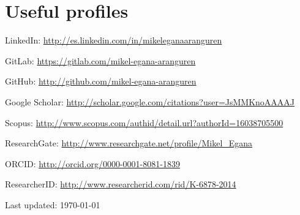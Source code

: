 \documentclass[11pt,fullpage]{article}
\renewenvironment{itemize}{
  \begin{list}{}{
    \setlength{\leftmargin}{1.5em}
  }
}{
  \end{list}
}
\begin{document}
\section*{Useful profiles}
\begin{itemize}
  \item LinkedIn: \href{http://es.linkedin.com/in/mikeleganaaranguren}{http://es.linkedin.com/in/mikeleganaaranguren}
  \item GitLab: \href{https://gitlab.com/mikel-egana-aranguren}{https://gitlab.com/mikel-egana-aranguren}
	\item GitHub: \href{http://github.com/mikel-egana-aranguren}{http://github.com/mikel-egana-aranguren}
	\item Google Scholar: \href{http://scholar.google.com/citations?user=JsMMKnoAAAAJ}{http://scholar.google.com/citations?user=JsMMKnoAAAAJ}
	\item Scopus: \href{http://www.scopus.com/authid/detail.url?authorId=16038705500}{http://www.scopus.com/authid/detail.url?authorId=16038705500}
	\item ResearchGate: \href{http://www.researchgate.net/profile/Mikel_Egana}{http://www.researchgate.net/profile/Mikel\_Egana}
	\item ORCID: \href{http://orcid.org/0000-0001-8081-1839}{http://orcid.org/0000-0001-8081-1839}
	\item ResearcherID: \href{http://www.researcherid.com/rid/K-6878-2014}{http://www.researcherid.com/rid/K-6878-2014}
\end{itemize}






\bigskip
\begin{center}
  \begin{footnotesize}
    Last updated: \today
  \end{footnotesize}
\end{center}



\end{document}

